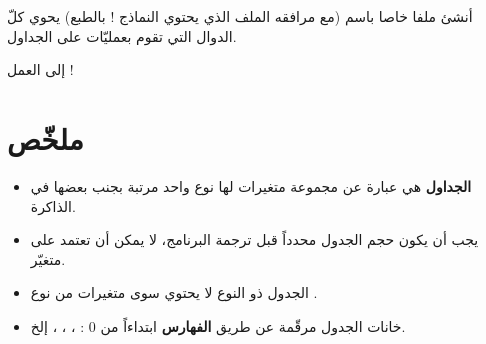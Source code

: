 \begin{information}
أنشئ ملفا خاصا باسم
(مع مرافقه الملف
الذي يحتوي النماذج ! بالطبع) يحوي كلّ الدوال التي تقوم بعمليّات على الجداول.
\end{information}

إلى العمل !

\section*{ملخّص}

\begin{itemize}
  \item \textbf{الجداول}
هي عبارة عن مجموعة متغيرات لها نوع واحد مرتبة بجنب بعضها في الذاكرة.
  \item يجب أن يكون حجم الجدول محدداً قبل ترجمة البرنامج، لا يمكن أن تعتمد على متغيّر.
  \item الجدول ذو النوع
لا يحتوي سوى متغيرات من نوع
.
  \item خانات الجدول مرقّمة عن طريق
\textbf{الفهارس}
ابتداءاً من 0 :
، ، ،
إلخ.
\end{itemize}
